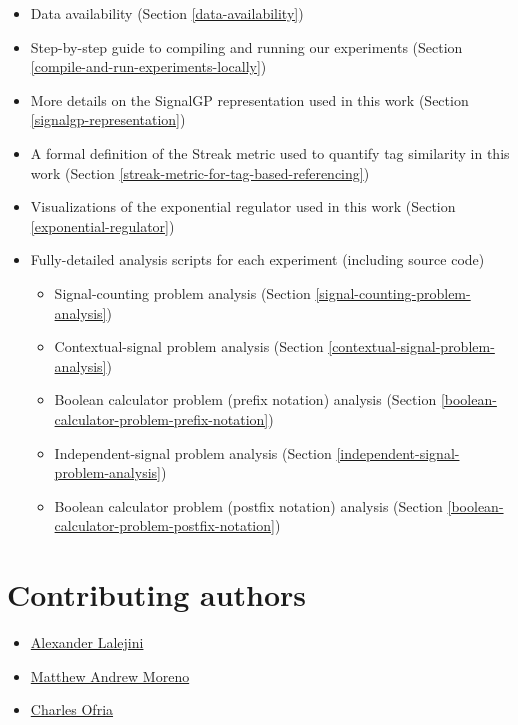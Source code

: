 \documentclass[]{book}
\providecommand{\tightlist}{%
  \setlength{\itemsep}{0pt}\setlength{\parskip}{0pt}}
\begin{document}
\begin{itemize}
\tightlist
\item
  Data availability (Section \ref{data-availability})
\item
  Step-by-step guide to compiling and running our experiments (Section \ref{compile-and-run-experiments-locally})
\item
  More details on the SignalGP representation used in this work (Section \ref{signalgp-representation})
\item
  A formal definition of the Streak metric used to quantify tag similarity in this work (Section \ref{streak-metric-for-tag-based-referencing})
\item
  Visualizations of the exponential regulator used in this work (Section \ref{exponential-regulator})
\item
  Fully-detailed analysis scripts for each experiment (including source code)

  \begin{itemize}
  \tightlist
  \item
    Signal-counting problem analysis (Section \ref{signal-counting-problem-analysis})
  \item
    Contextual-signal problem analysis (Section \ref{contextual-signal-problem-analysis})
  \item
    Boolean calculator problem (prefix notation) analysis (Section \ref{boolean-calculator-problem-prefix-notation})
  \item
    Independent-signal problem analysis (Section \ref{independent-signal-problem-analysis})
  \item
    Boolean calculator problem (postfix notation) analysis (Section \ref{boolean-calculator-problem-postfix-notation})
  \end{itemize}
\end{itemize}

\hypertarget{contributing-authors}{%
\section{Contributing authors}\label{contributing-authors}}

\begin{itemize}
\tightlist
\item
  \href{https://lalejini.com/}{Alexander Lalejini}
\item
  \href{http://mmore500.com/}{Matthew Andrew Moreno}
\item
  \href{https://ofria.com/}{Charles Ofria}
\end{itemize}
\end{document}
